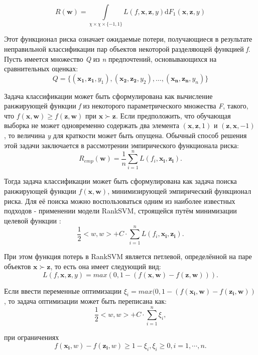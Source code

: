 \documentclass[10pt,a5paper,oneside]{article}
\begin{document}
\[
R(\mathbf{w}) = \int \limits_{\chi \times \chi \times \{-1, 1\}} L(f, \mathbf{x}, \mathbf{z}, y) \mathrm{d} F_1(\mathbf{x}, \mathbf{z}, y)
\]

\par
Этот функционал риска означает ожидаемые потери, получающиеся в результате неправильной классификации пар объектов некоторой разделяющей функцией \emph{f}. 
Пусть имеется множество \emph{Q} из \emph{n} предпочтений, основывающихся на сравнительных оценках:
\mbox{}
\[
Q = \{(\mathbf{x_1}, \mathbf{z_1}, y_1), (\mathbf{x_2}, \mathbf{z_2}, y_2), \dots, (\mathbf{x_n}, \mathbf{z_n}, y_n)\}
\]

\par
Задача классификации может быть сформулирована как вычисление ранжирующей функции \emph{f} из некоторого параметрического множества \emph{F}, такого, что \(f(\mathbf{x}, \mathbf{w}) \geq f(\mathbf{z}, \mathbf{w})\) при \(\mathbf{x} \succ \mathbf{z}\). 
Если предположить, что обучающая выборка не может одновременно содержать два элемента \((\mathbf{x}, \mathbf{z}, 1)\) и \((\mathbf{z}, \mathbf{x}, -1)\), то величина \emph{y} для краткости может быть опущена. 
Обычный способ решения этой задачи заключается в рассмотрении эмпирического функционала риска:
\mbox{}
\[
R_{emp}(\mathbf{w}) = \frac{1}{n} \sum \limits_{i=1}^n L(f_i, \mathbf{x_i}, \mathbf{z_i}).
\]

Тогда задача классификации может быть сформулирована как задача поиска ранжирующей функции \(f(\mathbf{x}, \mathbf{w})\), минимизирующей эмпирический функционал риска. 
Для её поиска можно воспользоваться одним из наиболее известных подходов - применении модели RankSVM, строящейся путём минимизации целевой функции :
\mbox{}
\[
\frac{1}{2} <w, w> + C \cdot \sum \limits_{i=1}^n L(f_i, \mathbf{x_i}, \mathbf{z_i}).
\] 

При этом функция потерь в RankSVM является петлевой, определённой на паре объектов \(\mathbf{x} \succ \mathbf{z}\), то есть она имеет следующий вид:
\mbox{}
\[
L(f, \mathbf{x}, \mathbf{z}, y) = max(0, 1 - (f(\mathbf{x}, \mathbf{w}) - f(\mathbf{z}, \mathbf{w}))).
\]

Если ввести переменные оптимизации \(\xi_i = max(0, 1 - (f(\mathbf{x_i}, \mathbf{w}) - f(\mathbf{z_i}, \mathbf{w}))\), то задача оптимизации может быть переписана как:
\mbox{}
\[
\frac{1}{2}<w, w> + C \cdot \sum \limits_{i=1}^n \xi_i,
\]

при ограничениях
\mbox{}
\[
f(\mathbf{x_i}, w) - f(\mathbf{z_i}, w) \geq 1 - \xi_i, 
\xi_i \geq 0, i = 1, \cdots, n.
\]
\end{document}
